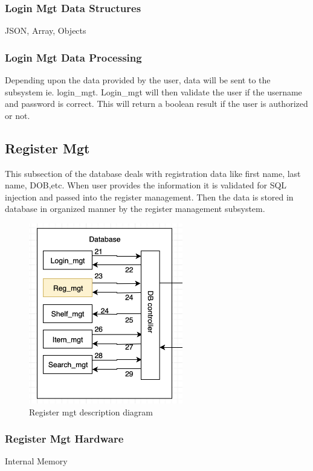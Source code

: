 \subsubsection{Login Mgt Data Structures}
JSON, Array, Objects

\subsubsection{Login Mgt Data Processing}
Depending upon the data provided by the user, data will be sent to the subsystem ie. login\_mgt. Login\_mgt will then validate the user if the username and password is correct. 
This will return a boolean result if the user is authorized or not.



\subsection{Register Mgt}
This subsection of the database deals with registration data like first name, last name, DOB,etc. When user provides the information it is validated for SQL injection and passed into the register management. Then the data is stored in database in organized manner by the register management subsystem.

\begin{figure}[h!]
	\centering
 	\includegraphics[width=0.60\textwidth]{images/regmgt}
 \caption{Register mgt description diagram}
\end{figure}


\subsubsection{Register Mgt Hardware}
Internal Memory

